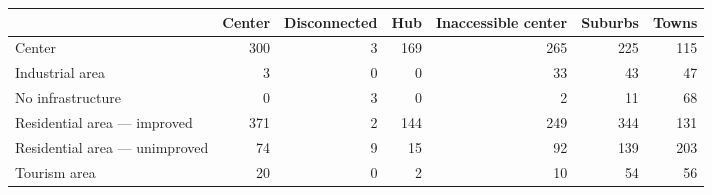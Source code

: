 \begin{tabular}{lrrrrrr}
\toprule
{} &  Center &  Disconnected &  Hub &  Inaccessible center &  Suburbs &  Towns \\
\midrule
Center                          &     300 &             3 &  169 &                  265 &      225 &    115 \\
Industrial area                 &       3 &             0 &    0 &                   33 &       43 &     47 \\
No infrastructure               &       0 &             3 &    0 &                    2 &       11 &     68 \\
Residential area --- improved   &     371 &             2 &  144 &                  249 &      344 &    131 \\
Residential area --- unimproved &      74 &             9 &   15 &                   92 &      139 &    203 \\
Tourism area                    &      20 &             0 &    2 &                   10 &       54 &     56 \\
\bottomrule
\end{tabular}
